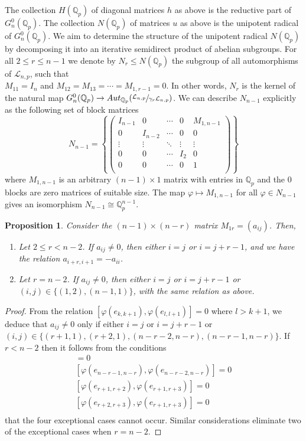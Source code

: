 \documentclass[12pt]{article}
\newtheorem{proposition2}[theorem2]{Proposition}
\begin{document}
The collection $H(\mathbb{Q}_{p})$ of diagonal matrices $h$ as above is the reductive part of $G_{n}^{0}(\mathbb{Q}_{p})$. The collection $N(\mathbb{Q}_{p})$ of matrices $u$ as above is the unipotent radical of $G_{n}^{0}(\mathbb{Q}_{p})$. We aim to determine the structure of the unipotent radical $N(\mathbb{Q}_p)$ by decomposing it into an iterative semidirect product of abelian subgroups.
For all $2\leq{r}\leq{n-1}$ we denote by $N_{r}\leq{N(\mathbb{Q}_{p})}$ the subgroup of all automorphisms of $\mathcal{L}_{n,p}$, such that\\ $M_{11}=I_{n}$ and $M_{12}=M_{13}=\cdots=M_{1,r-1}=0$. In other words, $N_{r}$ is the kernel of the natural map $G_{n}^{0}(\mathbb{Q}_{p})\rightarrow{Aut_{\mathbb{Q}_{p}}(\sfrac{\mathcal{L}_{n,p}}{\gamma_{r}\mathcal{L}_{n,p}})}$. We can describe $N_{n-1}$ explicitly as the following set of block matrices \[
N_{n-1}=\left\{\begin{pmatrix}
I_{n-1} & 0 & \cdots & 0 & M_{1,n-1}\\
0 & I_{n-2} & \cdots & 0 & 0\\
\vdots & \vdots & \ddots & \vdots & \vdots\\
0 & 0 & \cdots & I_{2} & 0\\
0 & 0 & \cdots & 0 & 1\\
\end{pmatrix}\right\}
\]
where $M_{1,n-1}$ is an arbitrary $(n-1)\times{1}$ matrix with entries in $\mathbb{Q}_{p}$ and the $0$ blocks are zero matrices of suitable size. The map $\varphi\mapsto{M_{1,n-1}}$ for all $\varphi\in{N_{n-1}}$ gives an isomorphism $N_{n-1}\cong\mathbb{Q}_{p}^{n-1}$.
\begin{proposition2}
\label{block.1r.structure}
Consider the $(n-1)\times{(n-r)}$ matrix $M_{1r}=(a_{ij})$. Then,
\begin{enumerate}
    \item Let $2\leq{r}<{n-2}$. If $a_{ij}\neq{0}$, then either $i=j$ or $i=j+r-1$, and we have the relation $a_{i+r,i+1}=-a_{ii}$.
    \item Let $r=n-2$. If $a_{ij}\neq{0}$, then either $i=j$ or $i=j+r-1$ or $(i,j)\in\{(1,2),(n-1,1)\}$, with the same relation as above.
\end{enumerate}
\end{proposition2}
\begin{proof}
From the relation $[\varphi(e_{k,k+1}),\varphi(e_{l,l+1})]=0$ where $l>k+1$, we deduce that $a_{ij}\neq{0}$ only if either $i=j$ or $i=j+r-1$ or\\ $(i,j)\in\{(r+1,1),(r+2,1),(n-r-2,n-r),(n-r-1,n-r)\}$. If $r<n-2$ then it follows from the conditions
\begin{align*}
[\varphi(e_{n-r-2,n-r-1}),\varphi(e_{n-r-2,n-r})]=0\\
[\varphi(e_{n-r-1,n-r}),\varphi(e_{n-r-2,n-r})]=0\\
[\varphi(e_{r+1,r+2}),\varphi(e_{r+1,r+3})]=0\\
[\varphi(e_{r+2,r+3}),\varphi(e_{r+1,r+3})]=0\\
\end{align*}
that the four exceptional cases cannot occur. Similar considerations eliminate two of the exceptional cases when $r=n-2$.
\end{proof}
\end{document}
